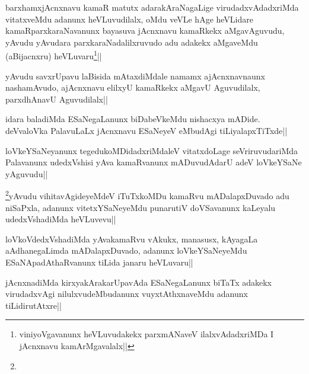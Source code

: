 
\begin{artha}
barxhamxjAcnxnavu kamaR matutx adarakAraNagaLige virudadxvAdadxriMda vitatxveMdu adanunx heVLuvudilalx, oMdu veVLe hAge heVLidare kamaRparxkaraNavanunx bayasuva jAcnxnavu kamaRkekx aMgavAguvudu, yAvudu yAvudara parxkaraNadalilxruvudo adu adakekx aMgaveMdu (aBijacnxru) heVLuvaru\footnote{viniyoVgavanunx heVLuvudakekx parxmANaveV ilalxvAdadxriMDa I jAcnxnavu kamArMgavalalx||}||
\end{artha}


\begin{artha}
yAvudu savxrUpavu laBisida mAtaxdiMdale namamx ajAcnxnavnaunx nashamAvudo, ajAcnxnavu elilxyU kamaRkekx aMgavU Aguvudilalx, parxdhAnavU Aguvudilalx||
\end{artha}

\begin{artha}
idara baladiMda ESaNegaLanunx biDabeVkeMdu nishacxya mADide. deVvaloVka PalavuLaLx jAcnxnavu ESaNeyeV eMbudAgi tiLiyalapxTiTxde||
\end{artha}

\begin{artha}
loVkeYSaNeyanunx tegedukoMDidadxriMdaleV vitatxdoLage seVriruvudariMda Palavanunx udedxVshisi yAva kamaRvanunx mADuvudAdarU adeV loVkeYSaNe yAguvudu||
\end{artha}


\begin{artha}
\footnote{}yAvudu vihitavAgideyeMdeV iTuTxkoMDu kamaRvu mADalapxDuvado adu niSaPxla, adanunx vitetxYSaNeyeMdu punarutiV doVSavanunx kaLeyalu udedxVshadiMda heVLuvevu||
\end{artha}


\begin{artha}
loVkoVdedxVshadiMda yAvakamaRvu vAkukx, manasusx, kAyagaLa aAdhanegaLimda mADalapxDuvado, adanunx loVkeYSaNeyeMdu ESaNApadAthaRvanunx tiLida janaru heVLuvaru||
\end{artha}


\begin{artha}
jAcnxnadiMda kirxyakArakarUpavAda ESaNegaLanunx biTaTx adakekx virudadxvAgi nilulxvudeMbudanunx vuyxtAthxnaveMdu adanunx tiLidirutAtxre||
\end{artha}

